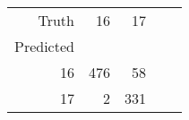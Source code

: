 \begin{tabular}{rrrrr}
\toprule
Truth & 16 & 17 \\
Predicted &  &  \\
\midrule
16 & 476 & 58 \\
17 & 2 & 331 \\
\bottomrule
\end{tabular}
